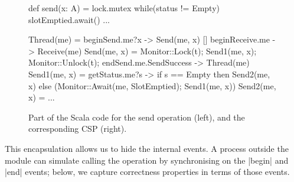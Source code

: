 %


\begin{figure}
\begin{center}
\begin{minipage}[t]{52mm}
\begin{scala}
def send(x: A) = lock.mutex{
  while(status != Empty) 
    slotEmptied.await()
  ...
}
\end{scala}
\end{minipage}
%
\qquad
%
\begin{minipage}[t]{100mm}
\begin{cspm}
Thread(me) = 
  beginSend.me?x -> Send(me, x)
  [] beginReceive.me -> Receive(me)
Send(me, x) = 
  Monitor::Lock(t); Send1(me, x); 
  Monitor::Unlock(t); endSend.me.SendSuccess -> Thread(me)
Send1(me, x) = 
  getStatus.me?s -> 
  if s == Empty then Send2(me, x)
  else (Monitor::Await(me, SlotEmptied); Send1(me, x))
Send2(me, x) = ...
\end{cspm}
\end{minipage}
\end{center}
\caption{Part of the Scala code for the {\scalastyle send} operation (left),
  and the corresponding CSP (right).}
\label{fig:send-scala-csp}
\end{figure}

This encapsulation  allows us to hide the internal events.  A process
outside the module can simulate calling the operation by synchronising on the
|begin| and |end| events; below, we capture correctness properties in terms of
those events.



